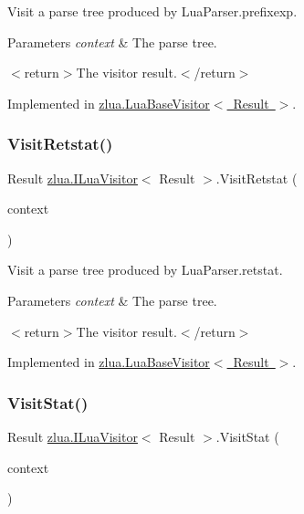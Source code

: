 Visit a parse tree produced by Lua\+Parser.\+prefixexp. 


\begin{DoxyParams}{Parameters}
{\em context} & The parse tree.\\
\hline
\end{DoxyParams}
$<$return$>$The visitor result.$<$/return$>$ 

Implemented in \mbox{\hyperlink{classzlua_1_1_lua_base_visitor_acad38edf087a3f799cf610a005c16715}{zlua.\+Lua\+Base\+Visitor$<$ Result $>$}}.

\mbox{\label{interfacezlua_1_1_i_lua_visitor_a0cba8f1a92102af4f881132e17be76f2}} 
\subsubsection{\texorpdfstring{Visit\+Retstat()}{VisitRetstat()}}
{\footnotesize\ttfamily Result \mbox{\hyperlink{interfacezlua_1_1_i_lua_visitor}{zlua.\+I\+Lua\+Visitor}}$<$ Result $>$.Visit\+Retstat (\begin{DoxyParamCaption}\item[{\mbox{[}\+Not\+Null\mbox{]} \mbox{\hyperlink{classzlua_1_1_lua_parser_1_1_retstat_context}{Lua\+Parser.\+Retstat\+Context}}}]{context }\end{DoxyParamCaption})}



Visit a parse tree produced by Lua\+Parser.\+retstat. 


\begin{DoxyParams}{Parameters}
{\em context} & The parse tree.\\
\hline
\end{DoxyParams}
$<$return$>$The visitor result.$<$/return$>$ 

Implemented in \mbox{\hyperlink{classzlua_1_1_lua_base_visitor_ab7354e58a007e8352ef5be6a0f31a3ad}{zlua.\+Lua\+Base\+Visitor$<$ Result $>$}}.

\mbox{\label{interfacezlua_1_1_i_lua_visitor_a8d7c64b132803afd5d1fd6601c273f76}} 
\subsubsection{\texorpdfstring{Visit\+Stat()}{VisitStat()}}
{\footnotesize\ttfamily Result \mbox{\hyperlink{interfacezlua_1_1_i_lua_visitor}{zlua.\+I\+Lua\+Visitor}}$<$ Result $>$.Visit\+Stat (\begin{DoxyParamCaption}\item[{\mbox{[}\+Not\+Null\mbox{]} \mbox{\hyperlink{classzlua_1_1_lua_parser_1_1_stat_context}{Lua\+Parser.\+Stat\+Context}}}]{context }\end{DoxyParamCaption})}



